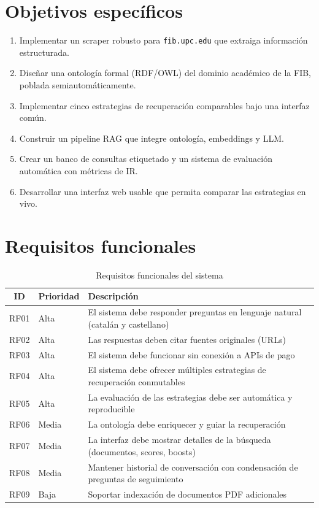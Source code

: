 \documentclass[12pt, a4paper, twoside]{report}
\begin{document}
\section{Objetivos espec\'ificos}

\begin{enumerate}
  \item Implementar un scraper robusto para \texttt{fib.upc.edu} que extraiga informaci\'on estructurada.
  \item Dise\~nar una ontolog\'ia formal (RDF/OWL) del dominio acad\'emico de la FIB, poblada semiautom\'aticamente.
  \item Implementar cinco estrategias de recuperaci\'on comparables bajo una interfaz com\'un.
  \item Construir un pipeline RAG que integre ontolog\'ia, embeddings y LLM.
  \item Crear un banco de consultas etiquetado y un sistema de evaluaci\'on autom\'atica con m\'etricas de IR.
  \item Desarrollar una interfaz web usable que permita comparar las estrategias en vivo.
\end{enumerate}

\section{Requisitos funcionales}

\begin{table}[H]
\centering
\caption{Requisitos funcionales del sistema}
\label{tab:req-funcionales}
\begin{tabularx}{\textwidth}{clX}
\toprule
\textbf{ID} & \textbf{Prioridad} & \textbf{Descripci\'on} \\
\midrule
RF01 & Alta & El sistema debe responder preguntas en lenguaje natural (catal\'an y castellano) \\
RF02 & Alta & Las respuestas deben citar fuentes originales (URLs) \\
RF03 & Alta & El sistema debe funcionar sin conexi\'on a APIs de pago \\
RF04 & Alta & El sistema debe ofrecer m\'ultiples estrategias de recuperaci\'on conmutables \\
RF05 & Alta & La evaluaci\'on de las estrategias debe ser autom\'atica y reproducible \\
RF06 & Media & La ontolog\'ia debe enriquecer y guiar la recuperaci\'on \\
RF07 & Media & La interfaz debe mostrar detalles de la b\'usqueda (documentos, scores, boosts) \\
RF08 & Media & Mantener historial de conversaci\'on con condensaci\'on de preguntas de seguimiento \\
RF09 & Baja & Soportar indexaci\'on de documentos PDF adicionales \\
\bottomrule
\end{tabularx}
\end{table}
\end{document}

